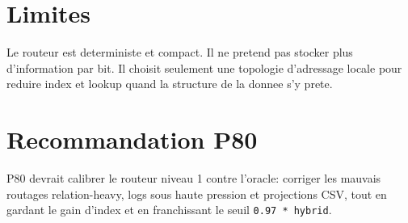 \documentclass[a4paper,11pt]{article}
\begin{document}
\section{Limites}

Le routeur est deterministe et compact. Il ne pretend pas stocker plus
d'information par bit. Il choisit seulement une topologie d'adressage locale
pour reduire index et lookup quand la structure de la donnee s'y prete.

\section{Recommandation P80}

P80 devrait calibrer le routeur niveau 1 contre l'oracle: corriger les mauvais
routages relation-heavy, logs sous haute pression et projections CSV, tout en
gardant le gain d'index et en franchissant le seuil \texttt{0.97 * hybrid}.
\end{document}
